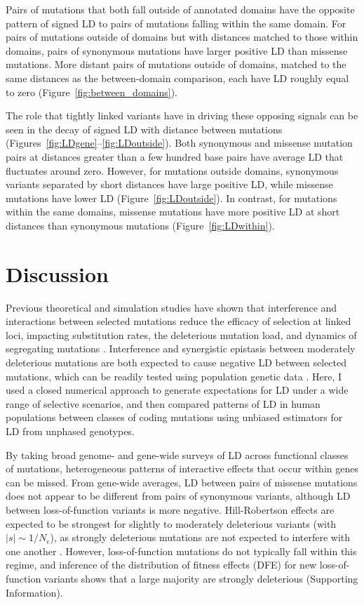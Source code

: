 \documentclass[]{article}
\begin{document}
Pairs of mutations that both fall outside of annotated domains have the
opposite pattern of signed LD to pairs of mutations falling within the same
domain. For pairs of mutations outside of domains but with distances matched to
those within domains, pairs of synonymous mutations have larger positive LD
than missense mutations. More distant pairs of mutations outside of domains,
matched to the same distances as the between-domain comparison, each have LD
roughly equal to zero (Figure~\ref{fig:between_domains}).

The role that tightly linked variants have in driving these opposing signals
can be seen in the decay of signed LD with distance between mutations
(Figures~\ref{fig:LDgene}--\ref{fig:LDoutside}). Both synonymous and missense
mutation pairs at distances greater than a few hundred base pairs have average
LD that fluctuates around zero. However, for mutations outside domains,
synonymous variants separated by short distances have large positive LD, while
missense mutations have lower LD (Figure~\ref{fig:LDoutside}). In contrast, for
mutations within the same domains, missense mutations have more positive LD at
short distances than synonymous mutations (Figure~\ref{fig:LDwithin}).

\section{Discussion}\label{sec:discussion}

Previous theoretical and simulation studies have shown that interference and
interactions between selected mutations reduce the efficacy of selection at
linked loci, impacting substitution rates, the deleterious mutation load, and
dynamics of segregating mutations
\citep{Hill1968-vu,Birky1988-jm,Barton1995-mj,McVean2000-ox}. Interference and
synergistic epistasis between moderately deleterious mutations are both
expected to cause negative LD between selected mutations, which can be readily
tested using population genetic data
\citep{Sohail2017-zq,Sandler2021-of,Garcia2021-zn}. Here, I used a closed
numerical approach to generate expectations for LD under a wide range of
selective scenarios, and then compared patterns of LD in human populations
between classes of coding mutations using unbiased estimators for LD from
unphased genotypes.

By taking broad genome- and gene-wide surveys of LD across functional classes
of mutations, heterogeneous patterns of interactive effects that occur within
genes can be missed. From gene-wide averages, LD between pairs of missense
mutations does not appear to be different from pairs of synonymous variants,
although LD between loss-of-function variants is more negative. Hill-Robertson
effects are expected to be strongest for slightly to moderately deleterious
variants (with \(|s|\sim 1/N_e\)), as strongly deleterious mutations are not
expected to interfere with one another \citep{McVean2000-ox}. However,
loss-of-function mutations do not typically fall within this regime, and
inference of the distribution of fitness effects (DFE) for new loss-of-function
variants shows that a large majority are strongly deleterious (Supporting
Information).
\end{document}
